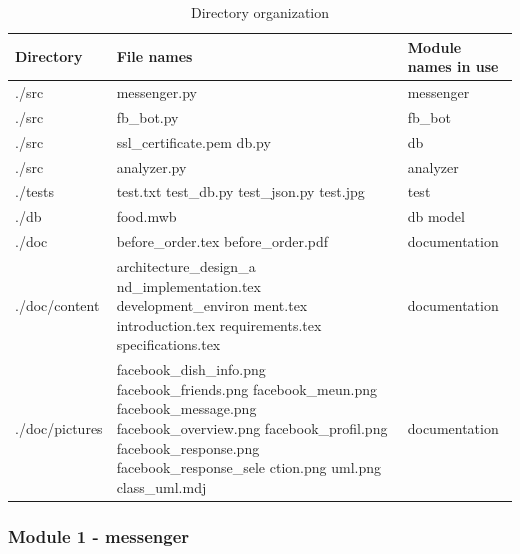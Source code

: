 \begin{table}[htbp]
\caption{Directory organization}
\begin{tabularx}{\linewidth}{|X|X|X|}
\toprule
Directory & File names & Module names in use  \\
\midrule
./src & messenger.py & messenger  \newline\\
./src & fb\_bot.py &  fb\_bot\newline \\
./src & ssl\_certificate.pem db.py \newline  & db \\
./src & analyzer.py & analyzer \newline \\
./tests & 
test.txt \newline 
test\_db.py \newline
test\_json.py	 \newline
test.jpg  \newline
& test\\
./db & food.mwb \newline & db model  \\
./doc & before\_order.tex before\_order.pdf \newline & documentation  \\
./doc/content & architecture\_design\_a nd\_implementation.tex development\_environ ment.tex introduction.tex requirements.tex specifications.tex \newline & documentation \\
./doc/pictures & 
facebook\_dish\_info.png \newline
facebook\_friends.png \newline
facebook\_meun.png \newline
facebook\_message.png \newline
facebook\_overview.png \newline
facebook\_profil.png \newline
facebook\_response.png \newline
facebook\_response\_sele ction.png	\newline
uml.png \newline
class\_uml.mdj 
& documentation \\
\end{tabularx}
\end{table}
\FloatBarrier

\subsubsection{Module 1 - messenger} 

